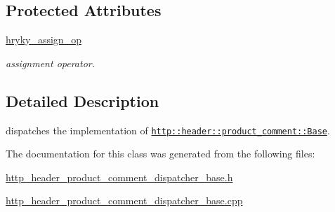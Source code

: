 \subsection*{Protected Attributes}
\begin{DoxyCompactItemize}
\item 
\hypertarget{classhryky_1_1http_1_1header_1_1product__comment_1_1dispatcher_1_1_base_a6bf0b76f80c964654b291df05b3d85a2}{\hyperlink{classhryky_1_1http_1_1header_1_1product__comment_1_1dispatcher_1_1_base_a6bf0b76f80c964654b291df05b3d85a2}{hryky\-\_\-assign\-\_\-op}}\label{classhryky_1_1http_1_1header_1_1product__comment_1_1dispatcher_1_1_base_a6bf0b76f80c964654b291df05b3d85a2}

\begin{DoxyCompactList}\small\item\em assignment operator. \end{DoxyCompactList}\end{DoxyCompactItemize}


\subsection{Detailed Description}
dispatches the implementation of \href{http::header::product_comment::Base}{\tt http\-::header\-::product\-\_\-comment\-::\-Base}. 

The documentation for this class was generated from the following files\-:\begin{DoxyCompactItemize}
\item 
\hyperlink{http__header__product__comment__dispatcher__base_8h}{http\-\_\-header\-\_\-product\-\_\-comment\-\_\-dispatcher\-\_\-base.\-h}\item 
\hyperlink{http__header__product__comment__dispatcher__base_8cpp}{http\-\_\-header\-\_\-product\-\_\-comment\-\_\-dispatcher\-\_\-base.\-cpp}\end{DoxyCompactItemize}
